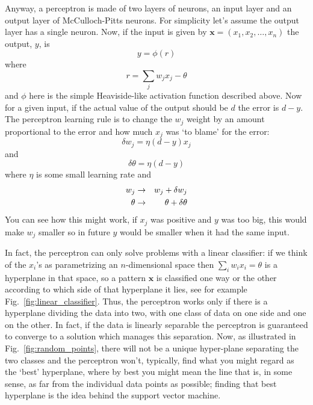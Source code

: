 \documentclass[12pt]{article}
\begin{document}
Anyway, a perceptron is made of two layers of neurons, an input layer
and an output layer of McCulloch-Pitts neurons. For simplicity let's
assume the output layer
has a single neuron. Now, if the input is given by
$\textbf{x}=(x_1,x_2,\ldots,x_n)$ the output, $y$, is
\begin{equation}
y=\phi(r)
\end{equation}
where
\begin{equation}
r=\sum_j w_j x_j-\theta
\end{equation}
and $\phi$ here is the simple Heaviside-like activation function
described above. Now for a given input, if the actual value of the
output should be $d$ the error is $d-y$. The perceptron learning rule
is to change the $w_j$ weight by an amount proportional to the error
and how much $x_j$ was \lq{}to blame\rq{} for the error:
\begin{equation}
\delta w_j=\eta (d-y) x_j
\end{equation}
and
\begin{equation}
\delta \theta =  \eta (d-y)
\end{equation}
where $\eta$ is some small learning rate and
\begin{eqnarray}
w_j&\rightarrow& w_j+\delta w_j\cr
\theta&\rightarrow& \theta+\delta\theta
\end{eqnarray}
You can see how this might work, if $x_j$ was positive and $y$ was too
big, this would make $w_j$ smaller so in future $y$ would be smaller
when it had the same input. 

In fact, the perceptron can only solve problems with a linear
classifier: if we think of the $x_i$'s as parametrizing an
$n$-dimensional space then $\sum_iw_ix_i=\theta$ is a hyperplane in
that space, so a pattern $\textbf{x}$ is classified one way or the
other according to which side of that hyperplane it lies, see for example Fig.~\ref{fig:linear_classifier}. Thus, the
perceptron works only if there is a hyperplane dividing the data into
two, with one class of data on one side and one on the other. In fact,
if the data is linearly separable the perceptron is guaranteed to
converge to a solution which manages this separation. Now, as
illustrated in Fig.~\ref{fig:random_points}, there will not be a unique
hyper-plane separating the two classes and the perceptron won't,
typically, find what you might regard as the \lq{}best\rq{}
hyperplane, where by best you might mean the line that is, in some
sense, as far from the individual data points as possible; finding
that best hyperplane is the idea behind the support vector machine.
\end{document}

